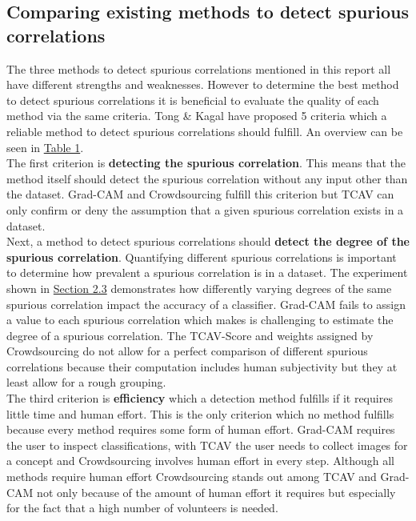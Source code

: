 \documentclass{article}
\begin{document}
\subsection{Comparing existing methods to detect spurious correlations}
The three methods to detect spurious correlations mentioned in this report all have different strengths and weaknesses.
However to determine the best method to detect spurious correlations it is beneficial to evaluate the quality of each method
via the same criteria. Tong \& Kagal \cite{tong2020investigating} have proposed 5 criteria which a reliable method to
detect spurious correlations should fulfill. An overview can be seen in \hyperref[tab:comparison]{Table 1}.\\
The first criterion is \textbf{detecting the spurious correlation}. This means that the method itself should detect
the spurious correlation without any input other than the dataset. Grad-CAM and Crowdsourcing fulfill this criterion
but TCAV can only confirm or deny the assumption that a given spurious correlation exists in a dataset. \\
Next, a method to detect spurious correlations should \textbf{detect the degree of the spurious correlation}.
Quantifying different spurious correlations is important to determine how prevalent a spurious correlation is in a dataset.
The experiment shown in \hyperref[sec:motivation]{Section 2.3} demonstrates how differently varying degrees of the same
spurious correlation impact the accuracy of a classifier. Grad-CAM fails to assign a value to each spurious correlation
which makes is challenging to estimate the degree of a spurious correlation. The TCAV-Score and weights assigned by
Crowdsourcing do not allow for a perfect comparison of different spurious correlations because their computation includes
human subjectivity but they at least allow for a rough grouping. \\
The third criterion is \textbf{efficiency} which a detection method fulfills if it requires little time and human effort.
This is the only criterion which no method fulfills because every method requires some form of human effort. Grad-CAM requires
the user to inspect classifications, with TCAV the user needs to collect images for a concept and Crowdsourcing involves
human effort in every step. Although all methods require human effort Crowdsourcing stands out among TCAV and Grad-CAM
not only because of the amount of human effort it requires but especially for the fact that a high number of
volunteers is needed. \\
\end{document}
